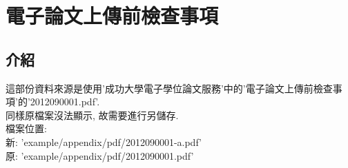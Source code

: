 
\chapter{電子論文上傳前檢查事項}
\label{appendix:e-paper_upload}

\section{介紹}
這部份資料來源是使用'成功大學電子學位論文服務'中的'電子論文上傳前檢查事項'的'2012090001.pdf'.\\

同樣原檔案沒法顯示, 故需要進行另儲存.\\

檔案位置:\\
新: 'example/appendix/pdf/2012090001-a.pdf'\\
原: 'example/appendix/pdf/2012090001.pdf'\\



